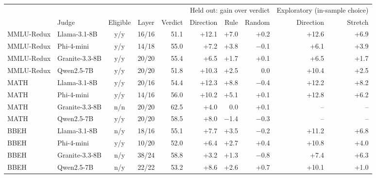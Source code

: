 \begin{tabular}{ll cc r rrr rr}
\toprule
& & & & & \multicolumn{3}{c}{Held out: gain over verdict} & \multicolumn{2}{c}{Exploratory (in-sample choice)} \\
\cmidrule(lr){6-8}\cmidrule(l){9-10}
& Judge & Eligible & Layer & Verdict & Direction & Rule & Random & Direction & Stretch \\
\midrule
MMLU-Redux & Llama-3.1-8B & y/y & 16/16 & 51.1 & +12.1 & +7.0 & +0.2 & +12.6 & +6.9 \\
MMLU-Redux & Phi-4-mini & y/y & 14/18 & 55.0 & +7.2 & +3.8 & $-$0.1 & +6.1 & +3.9 \\
MMLU-Redux & Granite-3.3-8B & y/y & 20/20 & 55.4 & +6.5 & +1.7 & +0.1 & +6.5 & +1.7 \\
MMLU-Redux & Qwen2.5-7B & y/y & 20/20 & 51.8 & +10.3 & +2.5 & 0.0 & +10.4 & +2.5 \\
\midrule
MATH & Llama-3.1-8B & y/y & 20/16 & 54.4 & +12.3 & +8.8 & $-$0.4 & +12.2 & +8.2 \\
MATH & Phi-4-mini & y/y & 14/16 & 56.0 & +10.2 & +5.1 & +0.1 & +12.8 & +6.2 \\
MATH & Granite-3.3-8B & n/n & 20/20 & 62.5 & +4.0 & 0.0 & +0.1 & -- & -- \\
MATH & Qwen2.5-7B & y/y & 20/20 & 58.5 & +8.0 & $-$1.4 & $-$0.3 & -- & -- \\
\midrule
BBEH & Llama-3.1-8B & n/y & 18/16 & 55.1 & +7.7 & +3.5 & $-$0.2 & +11.2 & +6.8 \\
BBEH & Phi-4-mini & y/y & 10/20 & 52.0 & +6.4 & +2.7 & +0.4 & +10.8 & +4.0 \\
BBEH & Granite-3.3-8B & n/y & 38/24 & 58.8 & +3.2 & +1.3 & $-$0.8 & +7.4 & +6.3 \\
BBEH & Qwen2.5-7B & n/y & 22/22 & 53.2 & +8.6 & +2.6 & +0.7 & +10.1 & +1.0 \\
\bottomrule
\end{tabular}
